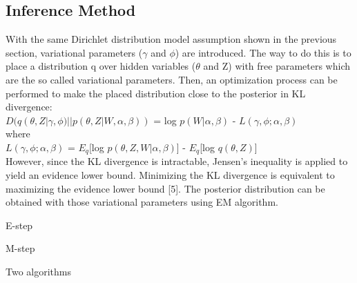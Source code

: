 \documentclass{article} %
\makeatletter
\def\BState{\State\hskip-\ALG@thistlm}
\makeatother
\begin{document}
\subsection{Inference Method}
With the same Dirichlet distribution model assumption shown in the previous section, variational parameters ($\gamma$ and $\phi$) are introduced. The way to do this is to place a distribution q over hidden variables ($\theta$ and Z) with free parameters which are the so called variational parameters. Then, an optimization process can be performed to make the placed distribution close to the posterior in KL divergence:\\
$D(q(\theta,Z|\gamma,\phi)||p(\theta,Z|W,\alpha,\beta))$ = log $p(W|\alpha,\beta)$ - $L(\gamma,\phi;\alpha,\beta)$\\
where\\
$L(\gamma,\phi;\alpha,\beta)$ = $E_q$[log $p(\theta,Z,W|\alpha,\beta)$] - $E_q$[log $q(\theta,Z)$]\\
However, since the KL divergence is intractable, Jensen's inequality is applied to yield an evidence lower bound. Minimizing the KL divergence is equivalent to maximizing the evidence lower bound [5]. The posterior distribution can be obtained with those variational parameters using EM algorithm.



\lipsum[1]
\begin{table}%
\begin{subalgorithm}{.5\textwidth}
\caption{E-step}\label{algo1}
\end{subalgorithm}%
\begin{subalgorithm}{.5\textwidth}
\caption{M-step}\label{algo2}
\end{subalgorithm}
\captionsetup{labelformat=alglabel}
\caption{Two algorithms}%
\label{tab:1}%
\end{table}
\end{document}
